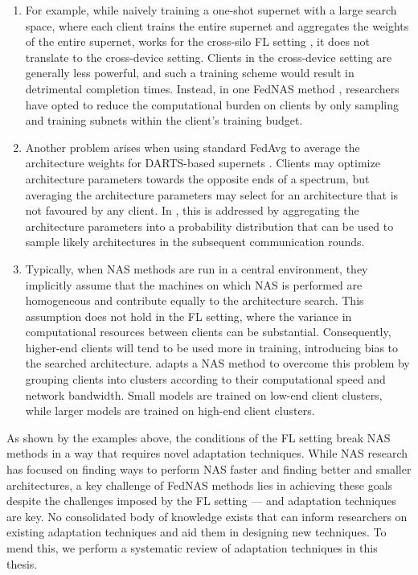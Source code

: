 \begin{enumerate}
    \item For example, while naively training a one-shot supernet with a large search space, where each client trains the entire supernet and aggregates the weights of the entire supernet, works for the cross-silo FL setting \cite{fednas_2021}, it does not translate to the cross-device setting. Clients in the cross-device setting are generally less powerful, and such a training scheme would result in detrimental completion times. Instead, in one FedNAS method \cite{fedoras_2022}, researchers have opted to reduce the computational burden on clients by only sampling and training subnets within the client's training budget.
    \item Another problem arises when using standard FedAvg to average the architecture weights for DARTS-based supernets \cite{darts_2019}. Clients may optimize architecture parameters towards the opposite ends of a spectrum, but averaging the architecture parameters may select for an architecture that is not favoured by any client. In \cite{efnas_2024}, this is addressed by aggregating the architecture parameters into a probability distribution that can be used to sample likely architectures in the subsequent communication rounds.
    \item Typically, when NAS methods are run in a central environment, they implicitly assume that the machines on which NAS is performed are homogeneous and contribute equally to the architecture search. This assumption does not hold in the FL setting, where the variance in computational resources between clients can be substantial. Consequently, higher-end clients will tend to be used more in training, introducing bias to the searched architecture. \cite{network_aware_fed_nas_2025} adapts a NAS method to overcome this problem by grouping clients into clusters according to their computational speed and network bandwidth. Small models are trained on low-end client clusters, while larger models are trained on high-end client clusters.
\end{enumerate}

As shown by the examples above, the conditions of the FL setting break NAS methods in a way that requires novel adaptation techniques. While NAS research has focused on finding ways to perform NAS faster and finding better and smaller architectures, a key challenge of FedNAS methods lies in achieving these goals despite the challenges imposed by the FL setting — and adaptation techniques are key. No consolidated body of knowledge exists that can inform researchers on existing adaptation techniques and aid them in designing new techniques. To mend this, we perform a systematic review of adaptation techniques in this thesis. 

